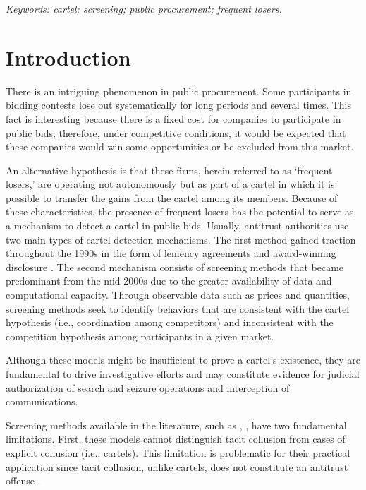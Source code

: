 \documentclass[10pt]{article}
\begin{document}
\begin{center}
{\footnotesize \textit{Keywords: cartel; screening; public procurement; frequent losers.}}
\end{center}


\vspace{2\baselineskip}
\section{Introduction}

There is an intriguing phenomenon in public procurement. Some participants in bidding contests lose out systematically for long periods and several times. This fact is interesting because there is a fixed cost for companies to participate in public bids; therefore, under competitive conditions, it would be expected that these companies would win some opportunities or be excluded from this market.

An alternative hypothesis is that these firms, herein referred to as ‘frequent losers,’ are operating not autonomously but as part of a cartel in which it is possible to transfer the gains from the cartel among its members. Because of these characteristics, the presence of frequent losers has the potential to serve as a mechanism to detect a cartel in public bids. Usually, antitrust authorities use two main types of cartel detection mechanisms. The first method gained traction throughout the 1990s in the form of leniency agreements and award-winning disclosure  \cite{wils2007leniency}. The second mechanism consists of screening methods that became predominant from the mid-2000s due to the greater availability of data and computational capacity. Through observable data such as prices and quantities, screening methods seek to identify behaviors that are consistent with the cartel hypothesis (i.e., coordination among competitors) and inconsistent with the competition hypothesis among participants in a given market.

 Although these models might be insufficient to prove a cartel’s existence, they are fundamental to drive investigative efforts and may constitute evidence for judicial authorization of search and seizure operations and interception of communications.

Screening methods available in the literature, such as  \cite{green1984noncooperative},  \cite{haltiwanger1991the}  \cite{haltiwanger1991the}  \cite{abrantesmetz2006a}, have two fundamental limitations. First, these models cannot distinguish tacit collusion from cases of explicit collusion (i.e., cartels). This limitation is problematic for their practical application since tacit collusion, unlike cartels, does not constitute an antitrust offense  \cite{harrington2008detecting}.
\end{document}
